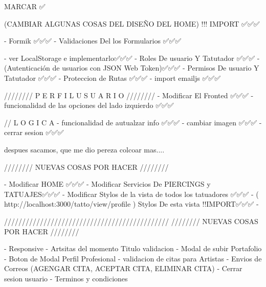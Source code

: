 
MARCAR ✅

(CAMBIAR ALGUNAS COSAS DEL DISEÑO DEL HOME) !!! IMPORT  ✅✅✅

    - Formik ✅✅✅
    - Validaciones Del los Formularios ✅✅✅

    - ver LocalStorage e implementarlo✅✅✅
    - Roles De usuario Y Tatutador ✅✅✅
    - (Autenticación de usuarios con JSON Web Token)✅✅✅
    - Permisos De usuario Y Tatutador ✅✅✅
    - Proteccion de Rutas ✅✅✅
    - import emailjs ✅✅✅



////////   P E R F I L   U S U A R I O   ////////  
    - Modificar El Fronted ✅✅✅
    - funcionalidad de las opciones del lado izquierdo ✅✅✅

    // L O G I C A
    - funcionalidad de autualzar info ✅✅✅
    - cambiar imagen ✅✅✅
    - cerrar sesion ✅✅✅

despues sacamos, que me dio pereza colcoar mas....

////////   NUEVAS COSAS POR HACER    ////////  

    - Modificar HOME ✅✅✅
    - Modificar Servicios De PIERCINGS y TATUAJES✅✅✅
    - Modificar Stylos de la vista de todos los tatuadores ✅✅✅
    - ( http://localhost:3000/tatto/view/profile )  Stylos De esta vista !!IMPORT✅✅✅
    -


//////////////////////////////////////////////
////////   NUEVAS COSAS POR HACER    //////// 

    - Responsive 
    - Artsitas del momento Titulo validacion 
    - Modal de subir Portafolio 
    - Boton de Modal Perfil Profesional
    - validacion de citas para Artistas
    - Envios de Correos (AGENGAR CITA,  ACEPTAR CITA, ELIMINAR CITA)
    - Cerrar sesion usuario 
    - Terminos y condiciones 






